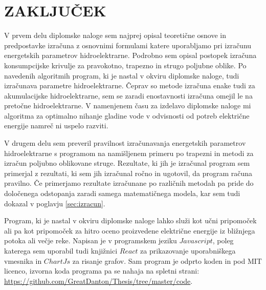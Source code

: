 
\chapter{ZAKLJUČEK}

V prvem delu diplomske naloge sem najprej opisal teoretične osnove in predpostavke izračuna z osnovnimi formulami katere uporabljamo pri izračunu energetskih parametrov hidroelektrarne. Podrobno sem opisal postopek izračuna konsumpcijske krivulje za pravokotno, trapezno in strugo poljubne oblike. Po navedenih algoritmih program, ki je nastal v okviru diplomske naloge, tudi izračunava parametre hidroelektrarne. Čeprav so metode izračuna enake tudi za akumulacijske hidroelektrarne, sem se zaradi enostavnosti izračuna omejil le na pretočne hidroelektrarne. V namenjenem času za izdelavo diplomske naloge mi algoritma za optimalno nihanje gladine vode v odvisnosti od potreb električne energije namreč ni uspelo razviti.


V drugem delu sem preveril pravilnost izračunavanja energetskih parametrov hidroelektrarne s programom na namišljenem primeru po trapezni in metodi za izračun poljubno oblikovane struge. Rezultate, ki jih je izračunal program sem primerjal z rezultati, ki sem jih izračunal ročno in ugotovil, da program računa pravilno. Če primerjamo rezultate izračunane po različnih metodah pa pride do določenega odstopanja zaradi samega matematičnega modela, kar sem tudi dokazal v poglavju \ref{sec:izracun}.


Program, ki je nastal v okviru diplomske naloge lahko služi kot učni pripomoček ali pa kot pripomoček za hitro oceno proizvedene električne energije iz bližnjega potoka ali večje reke. Napisan je v programskem jeziku $Javascript$, poleg katerega sem uporabil tudi knjižnici $React$ za prikazovanje uporabniškega vmesnika in $ChartJs$ za risanje grafov. Sam program je odprto koden in pod MIT licenco, izvorna koda programa pa se nahaja na spletni strani: \href{https://github.com/GreatDanton/Thesis/tree/master/code}{https://github.com/GreatDanton/Thesis/tree/master/code}.